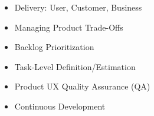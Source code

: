
  \begin{itemize}
    \setlength\itemsep{-0.3em}
    \item Delivery: User, Customer, Business
    \item Managing Product Trade-Offs 
    \item Backlog Prioritization
    \item Task-Level Definition/Estimation
    \item Product UX Quality Assurance (QA)
    \item Continuous Development
  \end{itemize}

% 
